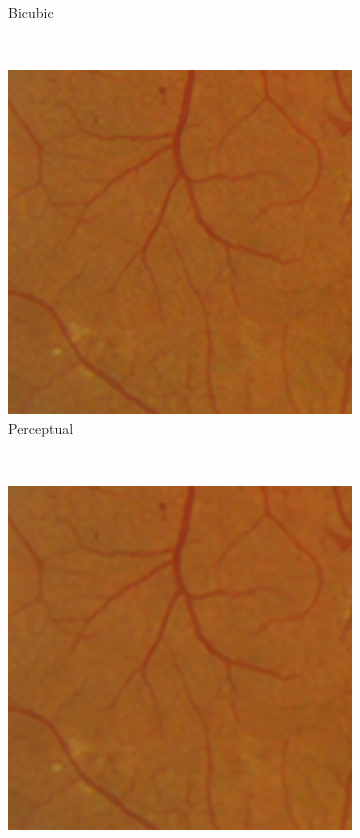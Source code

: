 \documentclass{scrartcl}
\begin{document}
\begin{figure}[htb]
{\begin{subfigure}{0.2\textwidth}
    \caption{Bicubic}
\end{subfigure}~
\begin{subfigure}{0.2\textwidth}
\centering
    \includegraphics[width=1.0\textwidth]{patch_sr1_perc}
    \caption{Perceptual}
\end{subfigure}~
\begin{subfigure}{0.2\textwidth}
\centering
    \includegraphics[width=1.0\textwidth]{patch_sr1_sal}

\end{subfigure}}
\end{figure}
\end{document}

